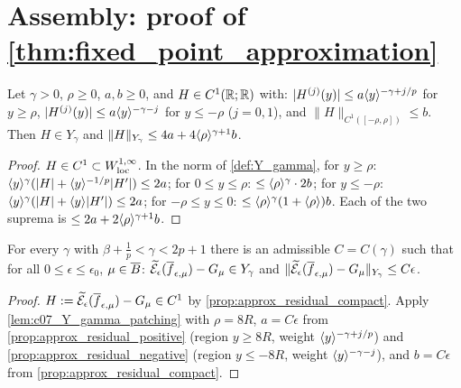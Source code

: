 \section{Assembly: proof of \texorpdfstring{\cref{thm:fixed_point_approximation}}{the approximation theorem}}

\begin{lemma}
  \label{lem:c07_Y_gamma_patching}
  Let $\gamma>0$, $\rho\ge0$, $a,b\ge0$, and $H\in C^1(\mathbb{R};\mathbb{R})$ with: $|H^{(j)}(y)|\le a\langle y \rangle^{-\gamma+j/p}$
  for $y\ge\rho$, $|H^{(j)}(y)|\le a\langle y \rangle^{-\gamma-j}$ for $y\le-\rho$ ($j=0,1$), and
  $\|H\|_{C^1([-\rho,\rho])}\le b$. Then $H\in Y_\gamma$ and $\|H\|_{Y_\gamma}\le4a+4\langle \rho \rangle^{\gamma+1}b$.
\end{lemma}
\begin{proof}
  $H\in C^1\subset W^{1,\infty}_{\textup{loc}}$. In the norm of \cref{def:Y_gamma}, for $y\ge\rho$:
  $\langle y \rangle^\gamma(|H|+\langle y \rangle^{-1/p}|H'|)\le2a$; for $0\le y\le\rho$: $\le\langle \rho \rangle^\gamma\cdot2b$; for
  $y\le-\rho$: $\langle y \rangle^\gamma(|H|+\langle y \rangle|H'|)\le2a$; for $-\rho\le y\le0$: $\le\langle \rho \rangle^{\gamma}(1+\langle \rho \rangle)b$.
  Each of the two suprema is $\le2a+2\langle \rho \rangle^{\gamma+1}b$.
\end{proof}

\begin{lemma}
  \label{lem:c07_tilde_residual_Y}
  For every $\gamma$ with $\beta+\frac1p<\gamma<2p+1$ there is an admissible $C=C(\gamma)$ such that for all
  $0\le\epsilon\le\epsilon_0$, $\mu\in\overline{B}$: $\widetilde{\mathcal{E}}_\epsilon(\overline{f}_{\epsilon,\mu})-G_\mu\in Y_\gamma$ and
  $\|\widetilde{\mathcal{E}}_\epsilon(\overline{f}_{\epsilon,\mu})-G_\mu\|_{Y_\gamma}\le C\epsilon$.
\end{lemma}
\begin{proof}
  $H:=\widetilde{\mathcal{E}}_\epsilon(\overline{f}_{\epsilon,\mu})-G_\mu\in C^1$ by \cref{prop:approx_residual_compact}. Apply
  \cref{lem:c07_Y_gamma_patching} with $\rho=8R$, $a=C\epsilon$ from \cref{prop:approx_residual_positive}
  (region $y\ge8R$, weight $\langle y \rangle^{-\gamma+j/p}$) and \cref{prop:approx_residual_negative} (region $y\le-8R$,
  weight $\langle y \rangle^{-\gamma-j}$), and $b=C\epsilon$ from \cref{prop:approx_residual_compact}.
\end{proof}

